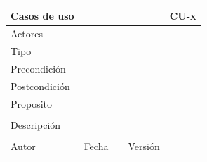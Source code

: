 \documentclass{article}
\begin{document}
\begin{table}[h]
\begin{tabular}{|l|l|l|l|l|l|}
\hline
\multicolumn{2}{|p{2cm}|}{Casos de uso}  & \multicolumn{3}{p{7cm}|}{} & CU-x \\
\hline
\multicolumn{2}{|p{2cm}|}{Actores}       & \multicolumn{4}{p{8cm}|}{}        \\
\hline
\multicolumn{2}{|p{2cm}|}{Tipo}          & \multicolumn{4}{p{8cm}|}{}        \\
\hline
\multicolumn{2}{|p{2cm}|}{Precondición}  & \multicolumn{4}{p{8cm}|}{}        \\
\hline
\multicolumn{2}{|p{2cm}|}{Postcondición} & \multicolumn{4}{p{8cm}|}{}        \\
\hline
\multicolumn{6}{|p{10cm}|}{Proposito}                                   \\
\hline
\multicolumn{6}{|p{10cm}|}{}                                            \\
\hline
\multicolumn{6}{|p{10cm}|}{Descripción}                                 \\
\hline
\multicolumn{6}{|p{10cm}|}{}                                            \\
\hline
Autor              &              & Fecha    &     &   Versión  &\\     
\hline
\end{tabular}
\end{table}
\end{document}
